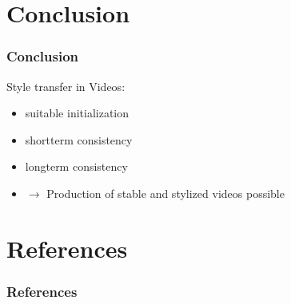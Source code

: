 \documentclass{beamer} %
\begin{document}
\section{Conclusion}
\begin{frame}
\frametitle{Conclusion}

Style transfer in Videos: 
\begin{itemize}
\item suitable initialization
\item shortterm consistency
\item longterm consistency 
\item $\longrightarrow$ Production of stable and stylized videos possible

\end{itemize}
\end{frame}
\section{References}
\begin{frame}
\frametitle{References}
\nocite{*}



\end{frame}
\end{document}
